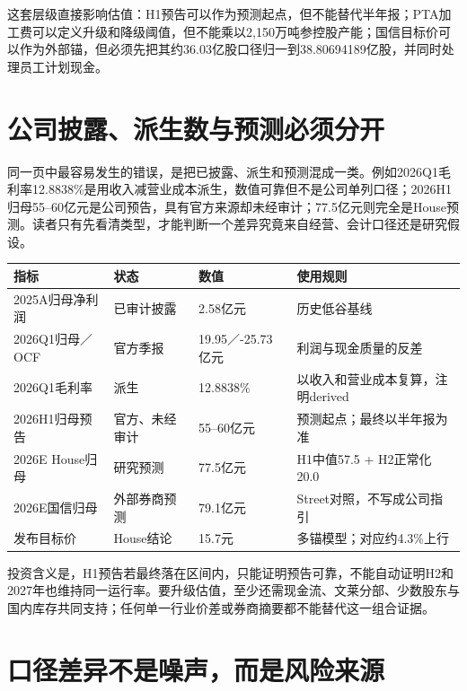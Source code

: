 这套层级直接影响估值：H1预告可以作为预测起点，但不能替代半年报；PTA加工费可以定义升级和降级阈值，但不能乘以2,150万吨参控股产能；国信目标价可以作为外部锚，但必须先把其约36.03亿股口径归一到38.80694189亿股，并同时处理员工计划现金。

\section{公司披露、派生数与预测必须分开}

同一页中最容易发生的错误，是把已披露、派生和预测混成一类。例如2026Q1毛利率12.8838\%是用收入减营业成本派生，数值可靠但不是公司单列口径；2026H1归母55--60亿元是公司预告，具有官方来源却未经审计；77.5亿元则完全是House预测。读者只有先看清类型，才能判断一个差异究竟来自经营、会计口径还是研究假设。

\begin{exhibitbox}[关键数字的状态标记]
\noindent\begin{tabularx}{\textwidth}{L{3.2cm}L{2.1cm}L{2.2cm}X}
\toprule
\textbf{指标} & \textbf{状态} & \textbf{数值} & \textbf{使用规则} \\
\midrule
2025A归母净利润 & 已审计披露 & 2.58亿元 & 历史低谷基线 \\
2026Q1归母／OCF & 官方季报 & 19.95／-25.73亿元 & 利润与现金质量的反差 \\
2026Q1毛利率 & 派生 & 12.8838\% & 以收入和营业成本复算，注明derived \\
2026H1归母预告 & 官方、未经审计 & 55--60亿元 & 预测起点；最终以半年报为准 \\
2026E House归母 & 研究预测 & 77.5亿元 & H1中值57.5 + H2正常化20.0 \\
2026E国信归母 & 外部券商预测 & 79.1亿元 & Street对照，不写成公司指引 \\
发布目标价 & House结论 & 15.7元 & 多锚模型；对应约4.3\%上行 \\
\bottomrule
\end{tabularx}
\end{exhibitbox}

投资含义是，H1预告若最终落在区间内，只能证明预告可靠，不能自动证明H2和2027年也维持同一运行率。要升级估值，至少还需现金流、文莱分部、少数股东与国内库存共同支持；任何单一行业价差或券商摘要都不能替代这一组合证据。

\section{口径差异不是噪声，而是风险来源}

